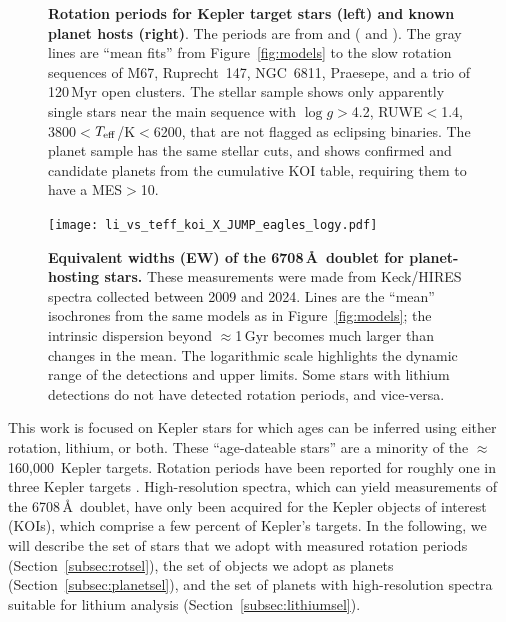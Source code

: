 \documentclass[11pt,twocolumn,tighten]{aastex63}
\newcommand{\nkeplerstars}{$\approx$160{,}000}
\begin{document}
\begin{figure}[!t]
  \begin{center}
  \end{center}
  \vspace{-0.5cm}
  \caption{
    {\bf Rotation periods for Kepler target stars (left) and known
    planet hosts (right)}.  The periods are from \citet{Santos_2019}
    and \citet{Santos_2021} ( and
    ).  The gray lines are ``mean fits'' from
    Figure~\ref{fig:models} to the slow rotation sequences of M67,
    Ruprecht~147, NGC~6811, Praesepe, and a trio of 120\,Myr open
    clusters.  The stellar sample shows only apparently single stars
    near the main sequence with $\log g$$>$4.2, RUWE$<$1.4,
    3800$<$$T_{\rm eff}$/K$<$6200, that are not flagged as eclipsing
    binaries.  The planet sample has the same stellar cuts, and shows
    confirmed and candidate planets from the cumulative KOI table,
    requiring them to have a MES$>$10.
  }
  \label{fig:prot_vs_teff}
\end{figure}

\begin{figure}[!t]
  \begin{center}
    \leavevmode
    \texttt{[image: li\_vs\_teff\_koi\_X\_JUMP\_eagles\_logy.pdf]}
  \end{center}
  \vspace{-0.6cm}
  \caption{
    {\bf Equivalent widths (EW) of the  6708\,\AA\ doublet
      for planet-hosting stars.} These measurements were made from
    Keck/HIRES spectra collected between 2009 and 2024.  Lines are the
    ``mean'' isochrones from the same models as in
    Figure~\ref{fig:models}; the intrinsic dispersion beyond
    $\approx$1\,Gyr becomes much larger than changes in the mean.  The
    logarithmic scale highlights the dynamic range of the detections
    and upper limits.  Some stars with lithium detections do not have
    detected rotation periods, and vice-versa.
    \label{fig:li_vs_teff}
  }
\end{figure}



This work is focused on Kepler stars for which ages can be inferred
using either rotation, lithium, or both.  These ``age-dateable
stars'' are a minority of the \nkeplerstars\ Kepler targets.  Rotation
periods have been reported for roughly one in three Kepler targets
\citep[e.g.][]{McQuillan_2014,Santos_2021}.  High-resolution spectra,
which can yield measurements of the  6708\,\AA\ doublet, 
have only been acquired for the Kepler objects of interest
(KOIs), which comprise a few percent of Kepler's targets.
In the following, we will describe the set of stars that we
adopt with measured rotation periods (Section~\ref{subsec:rotsel}),
the set of objects we adopt as planets
(Section~\ref{subsec:planetsel}), and the set of planets with
high-resolution spectra suitable for lithium analysis
(Section~\ref{subsec:lithiumsel}).
\end{document}
